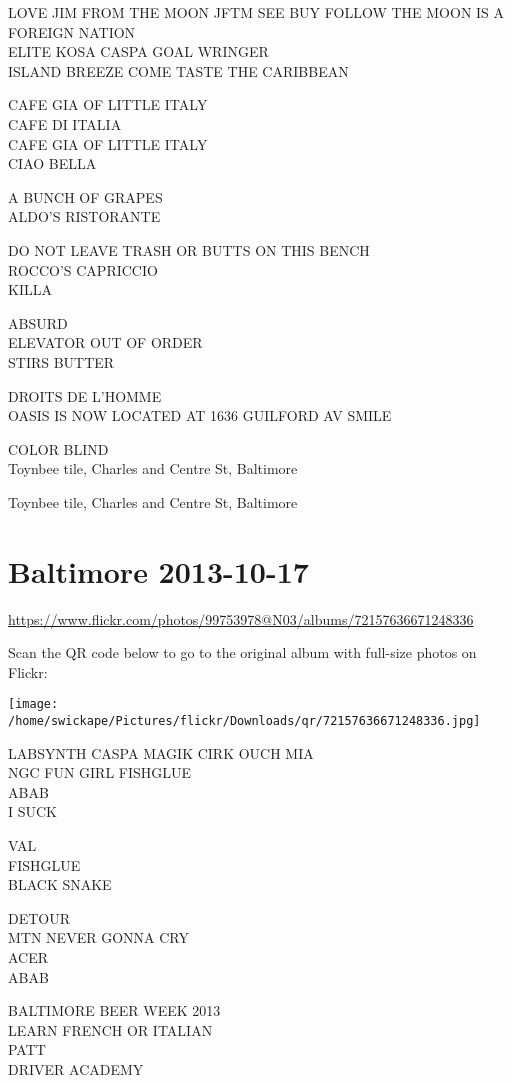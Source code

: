 \documentclass[10pt,letterpaper]{article}
\begin{document}
LOVE JIM FROM THE MOON JFTM SEE BUY FOLLOW THE MOON IS A FOREIGN NATION\\
ELITE KOSA CASPA GOAL WRINGER\\
ISLAND BREEZE COME TASTE THE CARIBBEAN

CAFE GIA OF LITTLE ITALY\\
CAFE DI ITALIA\\
CAFE GIA OF LITTLE ITALY\\
CIAO BELLA

A BUNCH OF GRAPES\\
ALDO'S RISTORANTE

DO NOT LEAVE TRASH OR BUTTS ON THIS BENCH\\
ROCCO'S CAPRICCIO\\
KILLA

ABSURD\\
ELEVATOR OUT OF ORDER\\
STIRS BUTTER

DROITS DE L'HOMME\\
OASIS IS NOW LOCATED AT 1636 GUILFORD AV SMILE

COLOR BLIND\\
Toynbee tile, Charles and Centre St, Baltimore

Toynbee tile, Charles and Centre St, Baltimore


\section*{Baltimore 2013-10-17}

\url{https://www.flickr.com/photos/99753978@N03/albums/72157636671248336}

Scan the QR code below to go to the original album with full-size photos on Flickr:

\texttt{[image: /home/swickape/Pictures/flickr/Downloads/qr/72157636671248336.jpg]}


LABSYNTH CASPA MAGIK CIRK OUCH MIA\\
NGC FUN GIRL FISHGLUE\\
ABAB\\
I SUCK

VAL\\
FISHGLUE\\
BLACK SNAKE

DETOUR\\
MTN NEVER GONNA CRY\\
ACER\\
ABAB

BALTIMORE BEER WEEK 2013\\
LEARN FRENCH OR ITALIAN\\
PATT\\
DRIVER ACADEMY
\end{document}
